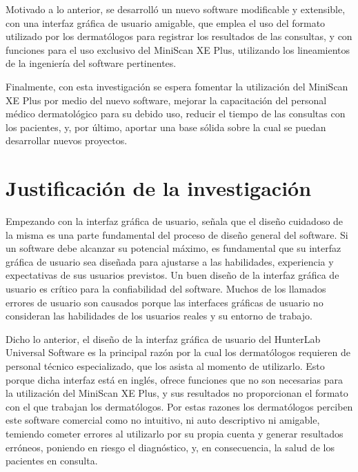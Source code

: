 Motivado a lo anterior, se desarroll\'{o} un nuevo software modificable y extensible, con una interfaz gr\'{a}fica de usuario amigable, que emplea el uso del formato utilizado por los dermat\'{o}logos para registrar los resultados de las consultas, y con funciones para el uso exclusivo del MiniScan XE Plus, utilizando los lineamientos de la ingenier\'{i}a del software pertinentes.

Finalmente, con esta investigaci\'{o}n se espera fomentar la utilizaci\'{o}n del \mbox{MiniScan} XE Plus por medio del nuevo software, mejorar la capacitaci\'{o}n del personal m\'{e}dico dermatol\'{o}gico para su debido uso, reducir el tiempo de las consultas con los pacientes, y, por \'{u}ltimo, aportar una base s\'{o}lida sobre la cual se puedan desarrollar nuevos proyectos.

	\section{Justificaci\'{o}n de la investigaci\'{o}n}
	
	Empezando con la interfaz gr\'{a}fica de usuario, \cite{Sommerville} se\~{n}ala que el dise\~{n}o cuidadoso de la misma es una parte fundamental del proceso de dise\~{n}o general del software. Si un software debe alcanzar su potencial m\'{a}ximo, es fundamental que su interfaz gr\'{a}fica de usuario sea dise\~{n}ada para ajustarse a las habilidades, experiencia y expectativas de sus usuarios previstos. Un buen dise\~{n}o de la interfaz gr\'{a}fica de usuario es cr\'{i}tico para la confiabilidad del software. Muchos de los llamados errores de usuario son causados porque las interfaces gr\'{a}ficas de usuario no consideran las habilidades de los usuarios reales y su entorno de trabajo.

	Dicho lo anterior, el dise\~{n}o de la interfaz gr\'{a}fica de usuario del HunterLab Universal Software es la principal raz\'{o}n por la cual los dermat\'{o}logos requieren de personal t\'{e}cnico especializado, que los asista al momento de utilizarlo. Esto porque dicha interfaz est\'{a} en ingl\'{e}s, ofrece funciones que no son necesarias para la utilizaci\'{o}n del MiniScan XE Plus, y sus resultados no proporcionan el formato con el que trabajan los dermat\'{o}logos. Por estas razones los dermat\'{o}logos perciben este software comercial como no intuitivo, ni auto descriptivo ni amigable, temiendo cometer errores al utilizarlo por su propia cuenta y generar resultados err\'{o}neos, poniendo en riesgo el diagn\'{o}stico, y, en consecuencia, la salud de los pacientes en consulta.

